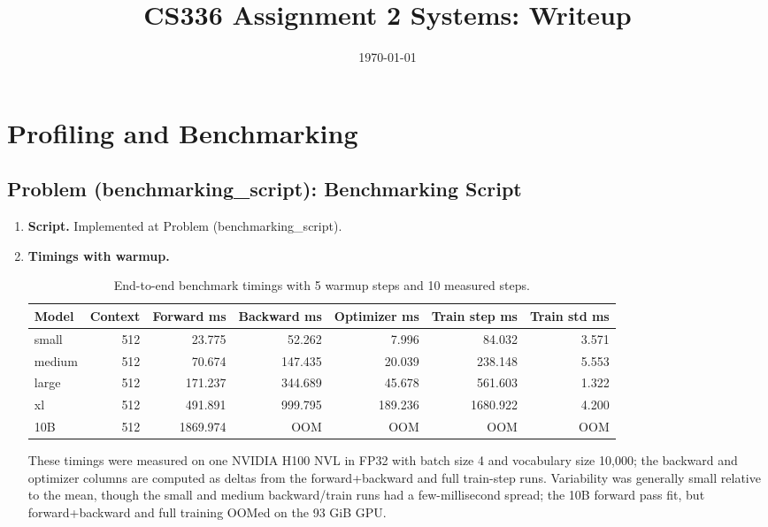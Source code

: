 \documentclass[11pt]{article}
\title{CS336 Assignment 2 Systems: Writeup}
\author{}
\date{\today}
\begin{document}
\maketitle
\tableofcontents
\newpage

\section{Profiling and Benchmarking}

\subsection{Problem (benchmarking\_script): Benchmarking Script}

\begin{enumerate}
  \item \textbf{Script.}
  Implemented at Problem (benchmarking\_script).

  \item \textbf{Timings with warmup.}
  \begin{table}[H]
    \centering
    \caption{End-to-end benchmark timings with 5 warmup steps and 10 measured steps.}
    \begin{tabular}{lrrrrrr}
      \toprule
      Model & Context & Forward ms & Backward ms & Optimizer ms & Train step ms & Train std ms \\
      \midrule
      small & 512 & 23.775 & 52.262 & 7.996 & 84.032 & 3.571 \\
      medium & 512 & 70.674 & 147.435 & 20.039 & 238.148 & 5.553 \\
      large & 512 & 171.237 & 344.689 & 45.678 & 561.603 & 1.322 \\
      xl & 512 & 491.891 & 999.795 & 189.236 & 1680.922 & 4.200 \\
      10B & 512 & 1869.974 & OOM & OOM & OOM & OOM \\
      \bottomrule
    \end{tabular}
  \end{table}
  These timings were measured on one NVIDIA H100 NVL in FP32 with batch size 4 and vocabulary size 10,000; the backward and optimizer columns are computed as deltas from the forward+backward and full train-step runs. Variability was generally small relative to the mean, though the small and medium backward/train runs had a few-millisecond spread; the 10B forward pass fit, but forward+backward and full training OOMed on the 93 GiB GPU.


\end{enumerate}
\end{document}
